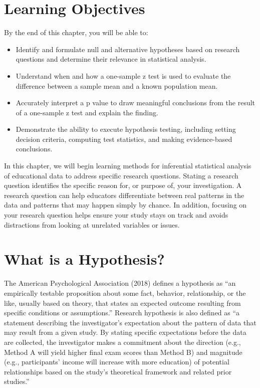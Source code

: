 \documentclass[
  letterpaper,
  DIV=11,
  numbers=noendperiod]{scrreprt}
\begin{document}

\section*{Learning Objectives}\label{learning-objectives-6}


By the end of this chapter, you will be able to:

\begin{itemize}
\item
  Identify and formulate null and alternative hypotheses based on
  research questions and determine their relevance in statistical
  analysis.
\item
  Understand when and how a one-sample z test is used to evaluate the
  difference between a sample mean and a known population mean.
\item
  Accurately interpret a p value to draw meaningful conclusions from the
  result of a one-sample z test and explain the finding.
\item
  Demonstrate the ability to execute hypothesis testing, including
  setting decision criteria, computing test statistics, and making
  evidence-based conclusions.
\end{itemize}

In this chapter, we will begin learning methods for inferential
statistical analysis of educational data to address specific research
questions. Stating a research question identifies the specific reason
for, or purpose of, your investigation. A research question can help
educators differentiate between real patterns in the data and patterns
that may happen simply by chance. In addition, focusing on your research
question helps ensure your study stays on track and avoids distractions
from looking at unrelated variables or issues.

\section{What is a Hypothesis?}\label{what-is-a-hypothesis}

The American Psychological Association (2018) defines a hypothesis as
``an empirically testable proposition about some fact, behavior,
relationship, or the like, usually based on theory, that states an
expected outcome resulting from specific conditions or assumptions.''
Research hypothesis is also defined as ``a statement describing the
investigator's expectation about the pattern of data that may result
from a given study. By stating specific expectations before the data are
collected, the investigator makes a commitment about the direction
(e.g., Method A will yield higher final exam scores than Method B) and
magnitude (e.g., participants' income will increase with more education)
of potential relationships based on the study's theoretical framework
and related prior studies.''
\end{document}
